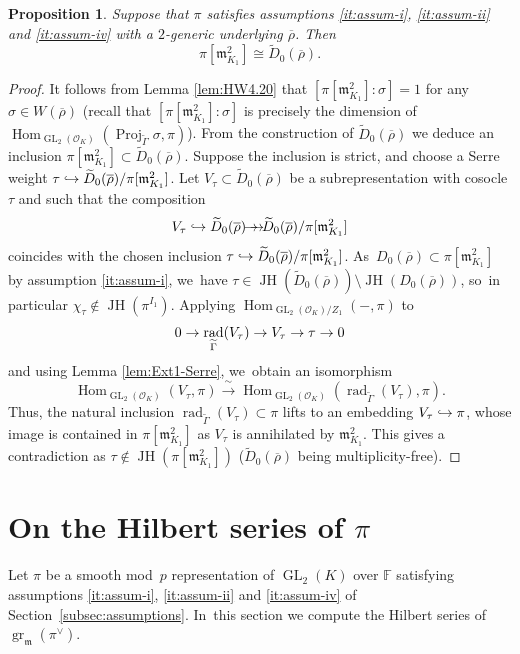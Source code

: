 \documentclass[JEP,XML,SOM,Unicode,NoFloatCountersInSection, NoEqCountersInSection,published]{cedram}
\newcommand\hto{\mathrel{\lhook\joinrel\to}}
\newcommand{\onto}{\mathchoice{\to\hspace*{-5mm}\to}{\mathrel{\hbox{$\to\hspace*{-2.85mm}\to$}}}{\to\hspace*{-3mm}\to}{\to\hspace*{-3mm}\to}}
\let\wt\widetilde
\newcommand{\F}{\mathbb{F}}
\newcommand{\cO}{\mathcal{O}}
\newcommand{\fm}{\mathfrak{m}}\let\m\fm
\newcommand{\brho}{\overline{\rho}}
\DeclareMathOperator{\GL}{GL}
\DeclareMathOperator{\gr}{gr}
\DeclareMathOperator{\Hom}{Hom}
\DeclareMathOperator{\JH}{\mathrm{JH}}
\DeclareMathOperator{\Proj}{Proj}
\DeclareMathOperator{\rad}{rad}
\newcommand{\simto}{\xrightarrow{\,\sim\,}}\let\congto\simto
\theoremstyle{plain}
\newtheorem{prop}{Proposition}[subsection]
\theoremstyle{definition}
\begin{document}
\begin{prop}\label{prop:ii'}
Suppose that $\pi$ satisfies assumptions \eqref{it:assum-i}, \eqref{it:assum-ii} and \eqref{it:assum-iv} {with a $2$-generic underlying $\brho$}. Then
\begin{equation}\label{eq:m2=wtD}
\pi[\fm_{K_1}^2]\cong\wt{D}_0(\brho).
\end{equation}
\end{prop}

\begin{proof}
It follows from Lemma \ref{lem:HW4.20} that $[\pi[\m_{K_1}^2]:\sigma]=1$ for any $\sigma\in W(\brho)$ (recall that $[\pi[\m_{K_1}^2]:\sigma]$ is precisely the dimension of $\Hom_{\GL_2(\cO_K)}(\Proj_{\widetilde{\Gamma}}\sigma,\pi)$). From the construction of $\wt{D}_{0}(\brho)$ we deduce an inclusion $\pi[\fm_{K_1}^2]\subset \wt{D}_0(\brho)$. Suppose the inclusion is strict, and choose a Serre weight $\tau\hto \wt{D}_0(\brho)/\pi[\fm_{K_1}^2]$. Let $V_{\tau}\subset \wt{D}_0(\brho)$ be a subrepresentation with cosocle $\tau$ and such that the composition
\[
V_{\tau}\hto \wt{D}_0(\brho)\onto \wt{D}_0(\brho)/\pi[\fm_{K_1}^2]
\]
coincides with the chosen inclusion $\tau\hto \wt{D}_0(\brho)/\pi[\fm_{K_1}^2]$. As~$D_0(\brho)\subset \pi[\fm_{K_1}^2]$ by assumption \eqref{it:assum-i}, we~have $\tau\in \JH(\wt{D}_0(\brho))\setminus \JH(D_0(\brho))$, so~in particular $\chi_{\tau}\notin \JH(\pi^{I_1})$. Applying $\Hom_{\GL_2(\cO_K)/Z_1}(-,\pi)$ to
\[
0\to \rad_{\wt{\Gamma}}(V_{\tau})\to V_{\tau}\to \tau\ra0
\]
and using Lemma \ref{lem:Ext1-Serre}, we~obtain an isomorphism
\[
\Hom_{\GL_2(\cO_K)}(V_{\tau},\pi)\simto \Hom_{\GL_2(\cO_K)}(\rad_{\wt{\Gamma}}(V_{\tau}),\pi).
\]
Thus, the natural inclusion $\rad_{\wt{\Gamma}}(V_{\tau})\subset\pi$ lifts to an embedding $V_{\tau}\hto \pi$, whose image is contained in $\pi[\m_{K_1}^2]$ as $V_{\tau}$ is annihilated by $\m_{K_1}^2$. This gives a contradiction as $\tau\notin\JH(\pi[\fm_{K_1}^2])$ ($\wt{D}_0(\brho)$ being multiplicity-free).
\end{proof}

\section{On the Hilbert series of \texorpdfstring{$\pi$}{pi}}
\label{sec:hilbert-polynomial}

Let $\pi$ be a smooth mod~$p$ representation of $\GL_2(K)$ over $\F$ satisfying assumptions \eqref{it:assum-i}, \eqref{it:assum-ii} and \eqref{it:assum-iv} of Section~\ref{subsec:assumptions}. In~this section we compute the Hilbert series of $\gr_{\m}(\pi^{\vee})$.
\end{document}
